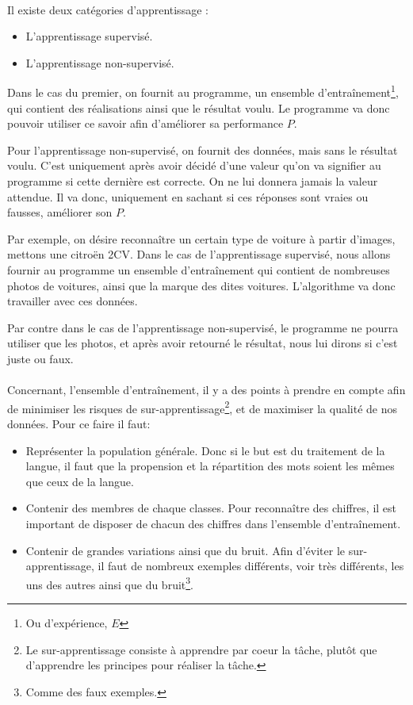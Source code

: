 \documentclass[a4paper, 11pt]{article}
\begin{document}
\paragraph{}
Il existe deux catégories d'apprentissage :
\begin{itemize}
\item L'apprentissage supervisé.
\item L'apprentissage non-supervisé.
\end{itemize}

Dans le cas du premier, on fournit au programme, un ensemble d'entraînement\footnote{Ou d'expérience, $E$}, qui contient des réalisations ainsi que le résultat voulu. Le programme va donc pouvoir utiliser ce savoir afin d'améliorer sa performance $P$.

Pour l'apprentissage non-supervisé, on fournit des données, mais sans le résultat voulu. C'est uniquement après avoir décidé d'une valeur qu'on va signifier au programme si cette dernière est correcte. On ne lui donnera jamais la valeur attendue. Il va donc, uniquement en sachant si ces réponses sont vraies ou fausses, améliorer son $P$.

Par exemple, on désire reconnaître un certain type de voiture à partir d'images, mettons une citroën 2CV. Dans le cas de l'apprentissage supervisé, nous allons fournir au programme un ensemble d'entraînement qui contient de nombreuses photos de voitures, ainsi que la marque des dites voitures. L'algorithme va donc travailler avec ces données.

Par contre dans le cas de l'apprentissage non-supervisé, le programme ne pourra utiliser que les photos, et après avoir retourné le résultat, nous lui dirons si c'est juste ou faux.

\paragraph{}
Concernant, l'ensemble d'entraînement, il y a des points à prendre en compte afin de minimiser les risques de sur-apprentissage\footnote{Le sur-apprentissage consiste à apprendre par coeur la tâche, plutôt que d'apprendre les principes pour réaliser la tâche.}, et de maximiser la qualité de nos données.
Pour ce faire il faut:
\begin{itemize}
\item Représenter la population générale. Donc si le but est du traitement de la langue, il faut que la propension et la répartition des mots soient les mêmes que ceux de la langue.
\item Contenir des membres de chaque classes. Pour reconnaître des chiffres, il est important de disposer de chacun des chiffres dans l'ensemble d'entraînement.
\item Contenir de grandes variations ainsi que du bruit. Afin d'éviter le sur-apprentissage, il faut de nombreux exemples différents, voir très différents, les uns des autres ainsi que du bruit\footnote{Comme des faux exemples.}.
\end{itemize}
\end{document}
